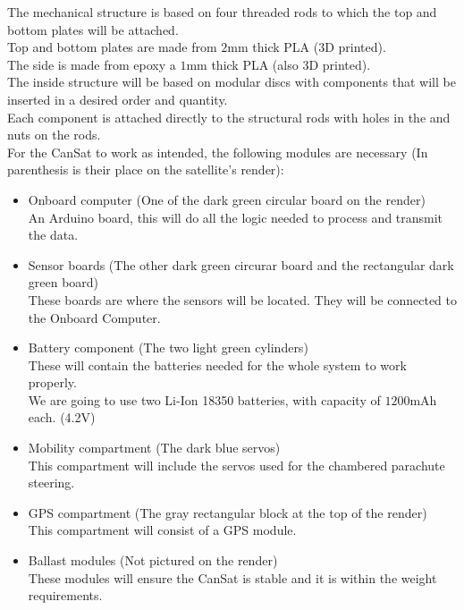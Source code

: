 \documentclass[class=report, crop=false]{standalone}
\begin{document}
The mechanical structure is based on four threaded rods to which the top and bottom plates will be attached. \\
Top and bottom plates are made from $2\text{mm}$ thick PLA (3D printed). \\
The side is made from epoxy a $1\text{mm}$ thick PLA (also 3D printed). \\
The inside structure will be based on modular discs with components that will be inserted in a desired order and quantity. \\
Each component is attached directly to the structural rods with holes in the  and nuts on the rods. \\
\newpage
For the CanSat to work as intended, the following modules are necessary (In parenthesis is their place on the satellite's render):
\begin{itemize}
\item Onboard computer (One of the dark green circular board on the render) \\
  An Arduino board, this will do all the logic needed to process and transmit the data. 
\item Sensor boards (The other dark green circurar board and the rectangular dark green board) \\
  These boards are where the sensors will be located. They will be connected to the Onboard Computer.
\item Battery component (The two light green cylinders) \\
  These will contain the batteries needed for the whole system to work properly. \\
  We are going to use two Li-Ion 18350 batteries, with capacity of $1200\text{mAh}$ each. (4.2V)
\item Mobility compartment (The dark blue servos) \\
  This compartment will include the servos used for the chambered parachute steering.
\item GPS compartment (The gray rectangular block at the top of the render) \\
  This compartment will consist of a GPS module. 
\item Ballast modules (Not pictured on the render) \\
    These modules will ensure the CanSat is stable and it is within the weight requirements.
\end{itemize}
\end{document}
